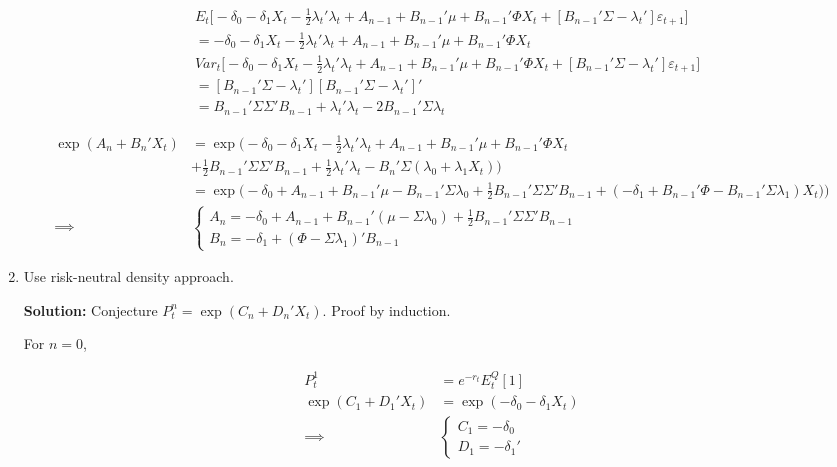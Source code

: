 \documentclass{article}
\begin{document}
\begin{enumerate}
\begin{align*}
& E_t \Bigg[-\delta_0 - \delta_1 X_t - \frac{1}{2} \lambda_t'\lambda_t  + A_{n-1} + B_{n-1}'\mu + B_{n-1}'\Phi X_t + [B_{n-1}'\Sigma - \lambda_t'] \varepsilon_{t+1}  \Bigg] \\
&=  -\delta_0 - \delta_1 X_t - \frac{1}{2} \lambda_t'\lambda_t  + A_{n-1} + B_{n-1}'\mu + B_{n-1}'\Phi X_t\\
& Var_t\Bigg[-\delta_0 - \delta_1 X_t - \frac{1}{2} \lambda_t'\lambda_t  + A_{n-1} + B_{n-1}'\mu + B_{n-1}'\Phi X_t + [B_{n-1}'\Sigma - \lambda_t'] \varepsilon_{t+1}  \Bigg] \\
&= [B_{n-1}'\Sigma - \lambda_t'][B_{n-1}'\Sigma - \lambda_t']'\\
&= B_{n-1}'\Sigma \Sigma' B_{n-1} + \lambda_t' \lambda_t - 2 B_{n-1}'\Sigma \lambda_t
\end{align*}

\begin{align*}
\exp(A_{n} + B_{n}'X_{t})
&= \exp\Bigg(-\delta_0 - \delta_1 X_t - \frac{1}{2} \lambda_t'\lambda_t  + A_{n-1} + B_{n-1}'\mu + B_{n-1}'\Phi X_t \\&+ \frac{1}{2} B_{n-1}'\Sigma \Sigma' B_{n-1} + \frac{1}{2}\lambda_t' \lambda_t - B_n'\Sigma (\lambda_0 + \lambda_1 X_t) \Bigg)\\
&= \exp\Bigg(-\delta_0   + A_{n-1} + B_{n-1}'\mu - B_{n-1}'\Sigma \lambda_0 + \frac{1}{2} B_{n-1}'\Sigma \Sigma' B_{n-1}+ (- \delta_1  + B_{n-1}'\Phi - B_{n-1}'\Sigma \lambda_1 )X_t  ) \Bigg)\\
\implies
&
\begin{cases}
A_n = - \delta_0 + A_{n-1} + B_{n-1}'(\mu - \Sigma \lambda_0) + \frac{1}{2} B_{n-1}'\Sigma \Sigma' B_{n-1}\\
B_n = - \delta_1  + (\Phi - \Sigma \lambda_1)' B_{n-1}
\end{cases}
\end{align*}

\item Use risk-neutral density approach.

\textbf{Solution:} Conjecture $P_t^n = \exp(C_n + D_n'X_t)$. Proof by induction.

For $n=0$,

\begin{align*}
P_t^1 
&= 
e^{-r_t}E_t^Q[1]\\
\exp(C_1 + D_1'X_t) 
&= 
\exp (-\delta_0 - \delta_1 X_t) \\
\implies&
\begin{cases}
C_1 = -\delta_0\\
D_1 = -\delta_1'
\end{cases}
\end{align*}


\end{enumerate}
\end{document}

